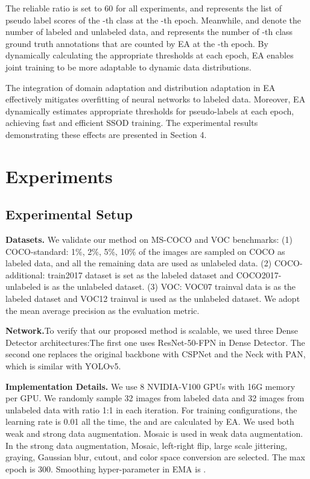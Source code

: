 \documentclass[10pt,twocolumn,letterpaper]{article}
\begin{document}
\begin{small}

\end{small}
\begin{small}

\end{small}
\noindent
The reliable ratio  is set to 60 for all experiments, and  represents the list of pseudo label scores of the -th class at the -th epoch. Meanwhile,  and  denote the number of labeled and unlabeled data, and  represents the number of -th class ground truth annotations that are counted by EA at the -th epoch. By dynamically calculating the appropriate thresholds at each epoch, EA enables joint training to be more adaptable to dynamic data distributions. 

The integration of domain adaptation and distribution adaptation in EA effectively mitigates overfitting of neural networks to labeled data. Moreover, EA dynamically estimates appropriate thresholds for pseudo-labels at each epoch, achieving fast and efficient SSOD training. The experimental results demonstrating these effects are presented in Section 4.



\section{Experiments}
\subsection{Experimental Setup}
\textbf{Datasets.} We validate our method on MS-COCO\cite{lin2014microsoft} and VOC\cite{everingham2012pascal} benchmarks: (1) COCO-standard: 1\%, 2\%, 5\%, 10\% of the images are sampled on COCO as labeled data, and all the remaining data are used as unlabeled data. (2) COCO-additional: train2017 dataset is set as the labeled dataset and COCO2017-unlabeled is as the unlabeled dataset. (3) VOC: VOC07 trainval data is as the labeled dataset and VOC12 trainval is used as the unlabeled dataset. We adopt the mean average precision  as the evaluation metric.

\textbf{Network.}To verify that our proposed method is scalable, we used three Dense Detector architectures:The first one uses ResNet-50-FPN in Dense Detector. The second one replaces the original backbone with CSPNet and the Neck with PAN, which is similar with YOLOv5.

\textbf{Implementation Details.} We use 8 NVIDIA-V100 GPUs with 16G memory per GPU. We randomly sample 32 images from labeled data and 32 images from unlabeled data with ratio 1:1 in each iteration. For training configurations, the learning rate is 0.01 all the time, the  and  are calculated by EA. We used both weak and strong data augmentation. Mosaic is used in weak data augmentation. In the strong data augmentation, Mosaic, left-right flip, large scale jittering, graying, Gaussian blur, cutout, and color space conversion are selected. The max epoch is 300. Smoothing hyper-parameter in EMA is . 
\end{document}
